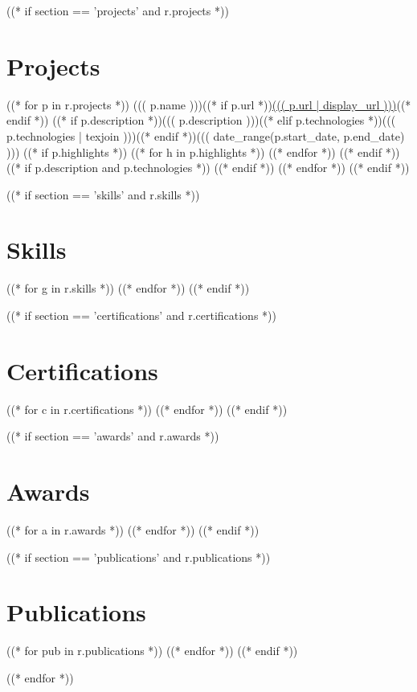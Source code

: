 ((* if section == 'projects' and r.projects *))
\section{Projects}
  \resumeSubHeadingListStart
((* for p in r.projects *))
    \resumeSubheading
      {((( p.name )))}{((* if p.url *))\href{((( p.url | url )))}{((( p.url | display_url )))}((* endif *))}
      {((* if p.description *))((( p.description )))((* elif p.technologies *))((( p.technologies | texjoin )))((* endif *))}{((( date_range(p.start_date, p.end_date) )))}
((* if p.highlights *))
      \resumeItemListStart
((* for h in p.highlights *))
((* endfor *))
      \resumeItemListEnd
((* endif *))
((* if p.description and p.technologies *))
      \resumeItemListStart
      \resumeItemListEnd
((* endif *))
((* endfor *))
  \resumeSubHeadingListEnd
((* endif *))

((* if section == 'skills' and r.skills *))
\section{Skills}
  \resumeSubHeadingListStart
((* for g in r.skills *))
((* endfor *))
  \resumeSubHeadingListEnd
((* endif *))

((* if section == 'certifications' and r.certifications *))
\section{Certifications}
  \resumeSubHeadingListStart
((* for c in r.certifications *))
((* endfor *))
  \resumeSubHeadingListEnd
((* endif *))

((* if section == 'awards' and r.awards *))
\section{Awards}
  \resumeSubHeadingListStart
((* for a in r.awards *))
((* endfor *))
  \resumeSubHeadingListEnd
((* endif *))

((* if section == 'publications' and r.publications *))
\section{Publications}
  \resumeSubHeadingListStart
((* for pub in r.publications *))
((* endfor *))
  \resumeSubHeadingListEnd
((* endif *))

((* endfor *))
